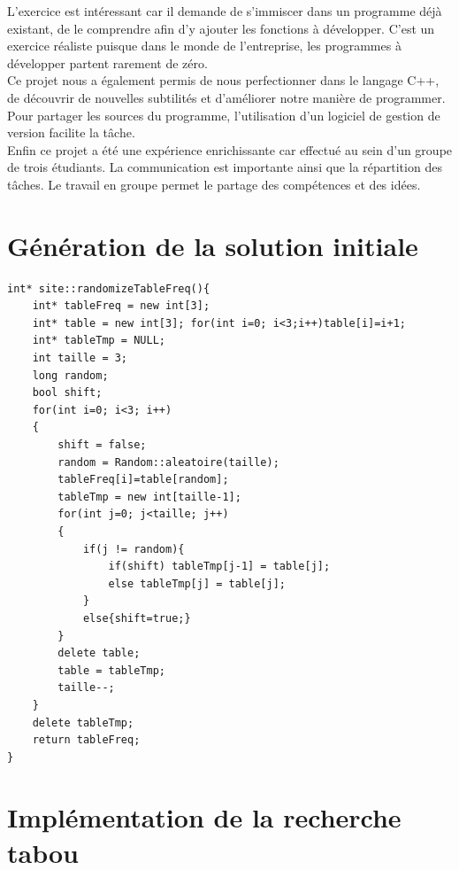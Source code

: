 \documentclass[a4paper, 11pt]{report}
\begin{document}
L'exercice est intéressant car il demande de s'immiscer dans un programme déjà existant, de le comprendre afin d'y ajouter les fonctions à développer. C'est un exercice réaliste puisque dans le monde de l'entreprise, les programmes à développer partent rarement de zéro.\\

Ce projet nous a également permis de nous perfectionner dans le langage C++, de découvrir de nouvelles subtilités et d'améliorer notre manière de programmer. Pour partager les sources du programme, l'utilisation d'un logiciel de gestion de version facilite la tâche.\\

Enfin ce projet a été une expérience enrichissante car effectué au sein d'un groupe de trois étudiants. La communication est importante ainsi que la répartition des tâches. Le travail en groupe permet le partage des compétences et des idées. \\

\appendix
\chapter{Génération de la solution initiale}
\begin{lstlisting}
int* site::randomizeTableFreq(){
    int* tableFreq = new int[3];
    int* table = new int[3]; for(int i=0; i<3;i++)table[i]=i+1;
    int* tableTmp = NULL;
    int taille = 3;
    long random;
    bool shift;
    for(int i=0; i<3; i++)
    {
        shift = false;
        random = Random::aleatoire(taille);
        tableFreq[i]=table[random];
        tableTmp = new int[taille-1];
        for(int j=0; j<taille; j++)
        {
            if(j != random){
                if(shift) tableTmp[j-1] = table[j];
                else tableTmp[j] = table[j];
            }
            else{shift=true;}
        }
        delete table;
        table = tableTmp;
        taille--;
    }
    delete tableTmp;
    return tableFreq;
}
\end{lstlisting}

\chapter{Implémentation de la recherche tabou}
\begin{lstlisting}
\end{lstlisting}
\end{document}
